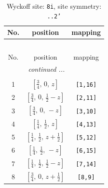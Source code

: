 \documentclass[fleqn,8pt]{jsarticle}
\begin{document}
\begin{longtable}{ccc}
\caption{Wyckoff site: {\tt 8i}, site symmetry: {\tt ..2'}}
 \\
 \hline \hline
No. & position & mapping \\ \hline \endfirsthead

\multicolumn{2}{l}{\tablename\ \thetable{}} \\
 \hline \hline
No. & position & mapping \\ \hline \endhead

 \hline \hline
\multicolumn{2}{r}{\footnotesize\it continued ...} \\ \endfoot

 \hline \hline
\multicolumn{2}{r}{} \\ \endlastfoot

1 & $\left[ \frac{3}{4},\, 0,\, z \right]$ & {\tt [1,16]} \\ \hline
2 & $\left[ \frac{3}{4},\, 0,\, \frac{1}{2} - z \right]$ & {\tt [2,11]} \\ \hline
3 & $\left[ \frac{3}{4},\, 0,\, - z \right]$ & {\tt [3,10]} \\ \hline
4 & $\left[ \frac{1}{4},\, \frac{1}{2},\, z \right]$ & {\tt [4,13]} \\ \hline
5 & $\left[ \frac{1}{4},\, \frac{1}{2},\, z + \frac{1}{2} \right]$ & {\tt [5,12]} \\ \hline
6 & $\left[ \frac{1}{4},\, \frac{1}{2},\, - z \right]$ & {\tt [6,15]} \\ \hline
7 & $\left[ \frac{1}{4},\, \frac{1}{2},\, \frac{1}{2} - z \right]$ & {\tt [7,14]} \\ \hline
8 & $\left[ \frac{3}{4},\, 0,\, z + \frac{1}{2} \right]$ & {\tt [8,9]} \\
\end{longtable}
\renewcommand{\arraystretch}{1.2}
\end{document}

